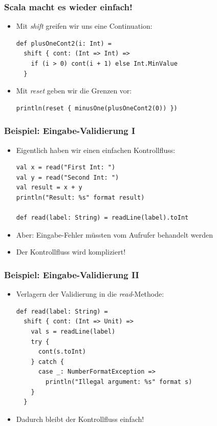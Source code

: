 \documentclass{beamer}
\begin{document}
\begin{frame}[fragile]
  \frametitle{Scala macht es wieder einfach!}
  \begin{itemize}
    \item Mit \emph{shift} greifen wir uns eine Continuation:
    \begin{lstlisting}
def plusOneCont2(i: Int) =
  shift { cont: (Int => Int) =>
    if (i > 0) cont(i + 1) else Int.MinValue
  }
    \end{lstlisting}
    \item Mit \emph{reset} geben wir die Grenzen vor:
    \begin{lstlisting}
println(reset { minusOne(plusOneCont2(0)) })
    \end{lstlisting}
  \end{itemize}
\end{frame}

\begin{frame}[fragile]
  \frametitle{Beispiel: Eingabe-Validierung I}
  \begin{itemize}
    \item Eigentlich haben wir einen einfachen Kontrollfluss:
    \begin{lstlisting}
val x = read("First Int: ")
val y = read("Second Int: ")
val result = x + y
println("Result: %s" format result)

def read(label: String) = readLine(label).toInt
    \end{lstlisting}
    \item Aber: Eingabe-Fehler m\"ussten vom Aufrufer behandelt werden
    \item Der Kontrollfluss wird kompliziert!
  \end{itemize}
\end{frame}

\begin{frame}[fragile]
  \frametitle{Beispiel: Eingabe-Validierung II}
  \begin{itemize}
    \item Verlagern der Validierung in die \emph{read}-Methode:
    \begin{lstlisting}
def read(label: String) =
  shift { cont: (Int => Unit) =>
    val s = readLine(label)
    try {
      cont(s.toInt)
    } catch {
      case _: NumberFormatException =>
        println("Illegal argument: %s" format s)
    }
  }
    \end{lstlisting}
    \item Dadurch bleibt der Kontrollfluss einfach!
  \end{itemize}
\end{frame}
\end{document}
